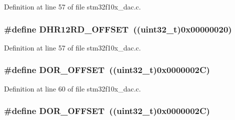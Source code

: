 Definition at line 57 of file stm32f10x\+\_\+dac.\+c.

\subsubsection[{\texorpdfstring{D\+H\+R12\+R\+D\+\_\+\+O\+F\+F\+S\+ET}{DHR12RD_OFFSET}}]{\setlength{\rightskip}{0pt plus 5cm}\#define D\+H\+R12\+R\+D\+\_\+\+O\+F\+F\+S\+ET~(({\bf uint32\+\_\+t})0x00000020)}\hypertarget{group___d_a_c___private___defines_ga2893b0491ec29a95fd061e5e0fa029e3}{}\label{group___d_a_c___private___defines_ga2893b0491ec29a95fd061e5e0fa029e3}


Definition at line 57 of file stm32f10x\+\_\+dac.\+c.

\subsubsection[{\texorpdfstring{D\+O\+R\+\_\+\+O\+F\+F\+S\+ET}{DOR_OFFSET}}]{\setlength{\rightskip}{0pt plus 5cm}\#define D\+O\+R\+\_\+\+O\+F\+F\+S\+ET~(({\bf uint32\+\_\+t})0x0000002\+C)}\hypertarget{group___d_a_c___private___defines_ga051bab7263211bd232d13665339c1745}{}\label{group___d_a_c___private___defines_ga051bab7263211bd232d13665339c1745}


Definition at line 60 of file stm32f10x\+\_\+dac.\+c.

\subsubsection[{\texorpdfstring{D\+O\+R\+\_\+\+O\+F\+F\+S\+ET}{DOR_OFFSET}}]{\setlength{\rightskip}{0pt plus 5cm}\#define D\+O\+R\+\_\+\+O\+F\+F\+S\+ET~(({\bf uint32\+\_\+t})0x0000002\+C)}\hypertarget{group___d_a_c___private___defines_ga051bab7263211bd232d13665339c1745}{}\label{group___d_a_c___private___defines_ga051bab7263211bd232d13665339c1745}


